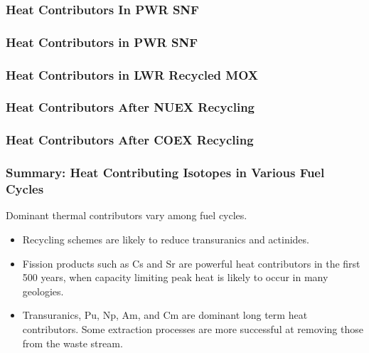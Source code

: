 
\begin{frame}
  \frametitle{Heat Contributors In PWR SNF}
\footnotesize{
  
}
\end{frame}

\begin{frame}
  \frametitle{Heat Contributors in PWR SNF}
\footnotesize{
  
}
\end{frame}
\begin{frame}
  \frametitle{Heat Contributors in LWR Recycled MOX}
\footnotesize{
  
}
\end{frame}
\begin{frame}
  \frametitle{Heat Contributors After NUEX Recycling}
\footnotesize{
  
}
\end{frame}

\begin{frame}
  \frametitle{Heat Contributors After COEX Recycling}
\footnotesize{
  
}
\end{frame}
\begin{frame}
  \frametitle{Summary: Heat Contributing Isotopes in Various Fuel Cycles}
Dominant thermal contributors vary among fuel cycles. 
\begin{itemize}
   \item Recycling schemes are likely to reduce transuranics and actinides.
   \item Fission products such as Cs and Sr are powerful heat contributors in 
     the first 500 years, when capacity limiting peak heat is likely to occur in 
     many geologies.
   \item Transuranics, Pu, Np, Am, and Cm are dominant long term heat contributors. Some extraction processes are more successful at removing those from the waste stream. 
\end{itemize}
\end{frame}
